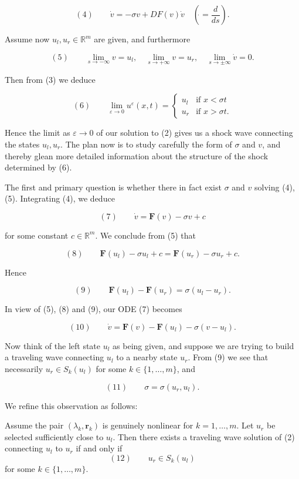 $$(4) \qquad \dot v = -\sigma v + DF(v)\dot v \quad \left(\dot{} = \frac{d}{ds}\right).$$

Assume now $u_l, u_r\in\mathbb{R}^m$ are given, and furthermore

$$(5) \qquad \lim_{s\to-\infty} v = u_l, \quad \lim_{s\to+\infty} v = u_r, \quad \lim_{s\to\pm\infty} \dot v = 0.$$

Then from (3) we deduce

$$(6) \qquad \lim_{\varepsilon\to 0} u^\varepsilon(x,t) = \begin{cases} u_l & \text{if } x<\sigma t \\ u_r & \text{if } x>\sigma t. \end{cases}$$

Hence the limit as $\varepsilon\to 0$ of our solution to (2) gives us a shock wave connecting the states $u_l, u_r$. The plan now is to study carefully the form of $\sigma$ and $v$, and thereby glean more detailed information about the structure of the shock determined by (6).

The first and primary question is whether there in fact exist $\sigma$ and $v$ solving (4), (5). Integrating (4), we deduce

$$(7) \qquad \dot v = \mathbf{F}(v) - \sigma v + c$$

for some constant $c\in\mathbb{R}^m$. We conclude from (5) that

$$(8) \qquad \mathbf{F}(u_l) - \sigma u_l + c = \mathbf{F}(u_r) - \sigma u_r + c.$$

Hence

$$(9) \qquad \mathbf{F}(u_l) - \mathbf{F}(u_r) = \sigma(u_l - u_r).$$

In view of (5), (8) and (9), our ODE (7) becomes

$$(10) \qquad \dot v = \mathbf{F}(v) - \mathbf{F}(u_l) - \sigma(v-u_l).$$

Now think of the left state $u_l$ as being given, and suppose we are trying to build a traveling wave connecting $u_l$ to a nearby state $u_r$. From (9) we see that necessarily $u_r\in S_k(u_l)$ for some $k\in\{1,\ldots,m\}$, and

$$(11) \qquad \sigma = \sigma(u_r,u_l).$$

We refine this observation as follows:

\begin{theorem}
\label{thm:existence-traveling-waves-genuinely-nonlinear}
Assume the pair $(\lambda_k, \mathbf{r}_k)$ is genuinely nonlinear for $k=1,\ldots,m$. Let $u_r$ be selected sufficiently close to $u_l$. Then there exists a traveling wave solution of (2) connecting $u_l$ to $u_r$ if and only if
$$(12) \qquad u_r \in S_k(u_l)$$
for some $k\in\{1,\ldots,m\}$.
\end{theorem}

